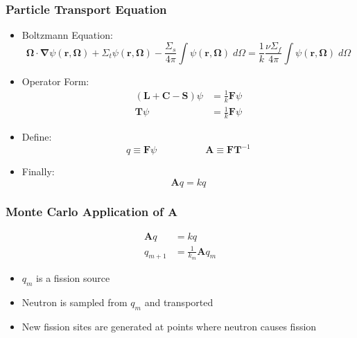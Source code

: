 \documentclass[color={usenames, dvipsnames},ignorenonframetext]{beamer}
\newcommand{\A}{\mathbf{A}}
\begin{document}
\begin{frame}
    \frametitle{Particle Transport Equation}
    \begin{itemize}
        \item Boltzmann Equation:
        \begin{equation*}
            \mathbf{\Omega}\cdot\mathbf{\nabla}\psi(\mathbf{r},\mathbf{\Omega})+\Sigma_t\psi(\mathbf{r},\mathbf{\Omega}) - \frac{\Sigma_s}{4\pi}\int \psi(\mathbf{r},\mathbf{\Omega})\;d\Omega =  \frac{1}{k}\frac{\nu\Sigma_f}{4\pi}\int \psi(\mathbf{r},\mathbf{\Omega})\;d\Omega
        \end{equation*}
        \item Operator Form:
        \begin{align*}
            \left(\mathbf{L} + \mathbf{C} - \mathbf{S}\right)\psi &= \frac{1}{k}\mathbf{F}\psi \\
            \mathbf{T}\psi &= \frac{1}{k}\mathbf{F}\psi
        \end{align*}
        \item Define:
        \begin{equation*}
            q \equiv \mathbf{F}\psi \hspace{5em} \A \equiv\mathbf{FT}^{-1}
        \end{equation*}
        \item Finally:
        \begin{equation*}
            \A q = kq
        \end{equation*}
    \end{itemize}
\end{frame}

\begin{frame}
    \frametitle{Monte Carlo Application of $\A$}
    \begin{align*}
        \A q &= kq \\
        q_{m+1} &= \frac{1}{k_m}\A q_m
    \end{align*}
    \begin{itemize}
        \item $q_m$ is a fission source
        \item Neutron is sampled from $q_m$ and transported
        \item New fission sites are generated at points where neutron causes fission
    \end{itemize}
\end{frame}
\end{document}
